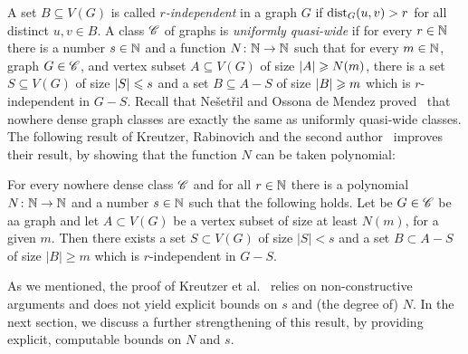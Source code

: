  

A set $B\subseteq V(G)$ is called {\em{$r$-independent}} in a graph $G$ if  $\mathrm{dist}_G(u,v)>r$ for all
distinct $u,v\in B$. 
A class $\mathscr{C}$ of graphs is \emph{uniformly quasi-wide} if for every $r\in \mathbb{N}$ there is a number $s\in \mathbb{N}$
and a function $N\colon\mathbb{N}\to\mathbb{N}$ such that
for every $m\in \mathbb{N}$, graph $G\in \mathscr{C}$, and vertex subset $A\subseteq V(G)$ of size $\left\lvert A\right\rvert\geqslant N(m)$, there is a set
$S\subseteq V(G)$ of size $\left\lvert S\right\rvert\leqslant s$ and a set
$B\subseteq A-S$ of size $\left\lvert B\right\rvert\geqslant m$ 
which is $r$-independent in $G-S$.
Recall that Ne\v set\v ril and Ossona de 
Mendez proved~\cite{nevsetvril2011nowhere} that nowhere dense graph classes are exactly the same as uniformly quasi-wide classes. 
The following result of Kreutzer, Rabinovich and the second author~\cite{siebertz2016polynomial}
improves their result, by showing that the function $N$ can be taken polynomial:

\begin{theorem}\label{thm:krs}
For every nowhere dense class $\mathscr{C}$
and for all $r\in \mathbb{N}$ there is a polynomial $N\colon \mathbb{N}\to\mathbb{N}$ 
and a number $s\in \mathbb{N}$ such that the following holds.
Let be $G\in \mathscr{C}$ be aa graph and let $A\subset V(G)$ be a vertex subset of size at least $N(m)$, for a given $m$.
Then there exists a set $S\subset V(G)$ of size $|S|<s$
and a set $B\subset A-S$ of size $|B|\ge m$ which is $r$-independent in $G-S$.	
\end{theorem}

As we mentioned, the proof of Kreutzer et al.~\cite{siebertz2016polynomial} relies on non-constructive arguments and does not yield explicit bounds on $s$ and (the degree of) $N$. 
In the next section, we discuss a further strengthening of this result, by providing explicit, computable bounds on $N$ and $s$.